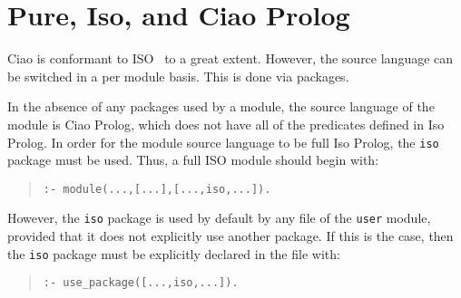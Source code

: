 
\section{Pure, Iso, and Ciao Prolog}
\label{sec:prolog}

Ciao is conformant to ISO~\cite{iso-prolog} to a great
extent. However, the source language can be switched in a per module
basis. This is done via packages. 

In the absence of any packages used by a module, the source language
of the module is Ciao Prolog, which does not have all of the
predicates defined in Iso Prolog. In order for the module source
language to be full Iso Prolog, the \verb+iso+ package must be
used. Thus, a full ISO module should begin with:
\begin{quote}
\begin{verbatim}
:- module(...,[...],[...,iso,...]).
\end{verbatim}
\end{quote}

However, the \verb+iso+ package is used by default by any file of the
\verb+user+ module, provided that it does not explicitly use another
package. If this is the case, then the \verb+iso+ package must be
explicitly declared in the file with:
\begin{quote}
\begin{verbatim}
:- use_package([...,iso,...]).
\end{verbatim}
\end{quote}

